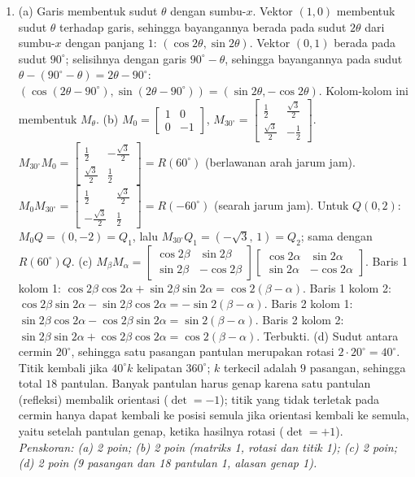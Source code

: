 \documentclass[a4paper,11pt]{article}
\begin{document}
\begin{enumerate}[leftmargin=2em,itemsep=3pt,topsep=2pt]
\item[\textbf{5.}] (a) Garis membentuk sudut $\theta$ dengan sumbu-$x$. Vektor $(1,0)$ membentuk sudut $\theta$ terhadap garis, sehingga bayangannya berada pada sudut $2\theta$ dari sumbu-$x$ dengan panjang $1$: $(\cos2\theta,\sin2\theta)$. Vektor $(0,1)$ berada pada sudut $90^\circ$; selisihnya dengan garis $90^\circ-\theta$, sehingga bayangannya pada sudut $\theta-(90^\circ-\theta)=2\theta-90^\circ$: $(\cos(2\theta-90^\circ),\sin(2\theta-90^\circ))=(\sin2\theta,-\cos2\theta)$. Kolom-kolom ini membentuk $M_\theta$. (b) $M_0=\begin{bmatrix}1&0\\0&-1\end{bmatrix}$, $M_{30^\circ}=\begin{bmatrix}\frac12&\frac{\sqrt3}{2}\\\frac{\sqrt3}{2}&-\frac12\end{bmatrix}$. $M_{30^\circ}M_0=\begin{bmatrix}\frac12&-\frac{\sqrt3}{2}\\\frac{\sqrt3}{2}&\frac12\end{bmatrix}=R(60^\circ)$ (berlawanan arah jarum jam). $M_0M_{30^\circ}=\begin{bmatrix}\frac12&\frac{\sqrt3}{2}\\-\frac{\sqrt3}{2}&\frac12\end{bmatrix}=R(-60^\circ)$ (searah jarum jam). Untuk $Q(0,2)$: $M_0Q=(0,-2)=Q_1$, lalu $M_{30^\circ}Q_1=(-\sqrt3,\,1)=Q_2$; sama dengan $R(60^\circ)Q$. (c) $M_\beta M_\alpha=\begin{bmatrix}\cos2\beta&\sin2\beta\\\sin2\beta&-\cos2\beta\end{bmatrix}\begin{bmatrix}\cos2\alpha&\sin2\alpha\\\sin2\alpha&-\cos2\alpha\end{bmatrix}$. Baris 1 kolom 1: $\cos2\beta\cos2\alpha+\sin2\beta\sin2\alpha=\cos2(\beta-\alpha)$. Baris 1 kolom 2: $\cos2\beta\sin2\alpha-\sin2\beta\cos2\alpha=-\sin2(\beta-\alpha)$. Baris 2 kolom 1: $\sin2\beta\cos2\alpha-\cos2\beta\sin2\alpha=\sin2(\beta-\alpha)$. Baris 2 kolom 2: $\sin2\beta\sin2\alpha+\cos2\beta\cos2\alpha=\cos2(\beta-\alpha)$. Terbukti. (d) Sudut antara cermin $20^\circ$, sehingga satu pasangan pantulan merupakan rotasi $2\cdot20^\circ=40^\circ$. Titik kembali jika $40^\circ k$ kelipatan $360^\circ$; $k$ terkecil adalah $9$ pasangan, sehingga total $18$ pantulan. Banyak pantulan harus genap karena satu pantulan (refleksi) membalik orientasi ($\det=-1$); titik yang tidak terletak pada cermin hanya dapat kembali ke posisi semula jika orientasi kembali ke semula, yaitu setelah pantulan genap, ketika hasilnya rotasi ($\det=+1$). \\ \textit{Penskoran: (a) 2 poin; (b) 2 poin (matriks 1, rotasi dan titik 1); (c) 2 poin; (d) 2 poin (9 pasangan dan 18 pantulan 1, alasan genap 1).}
\end{enumerate}
\end{document}
